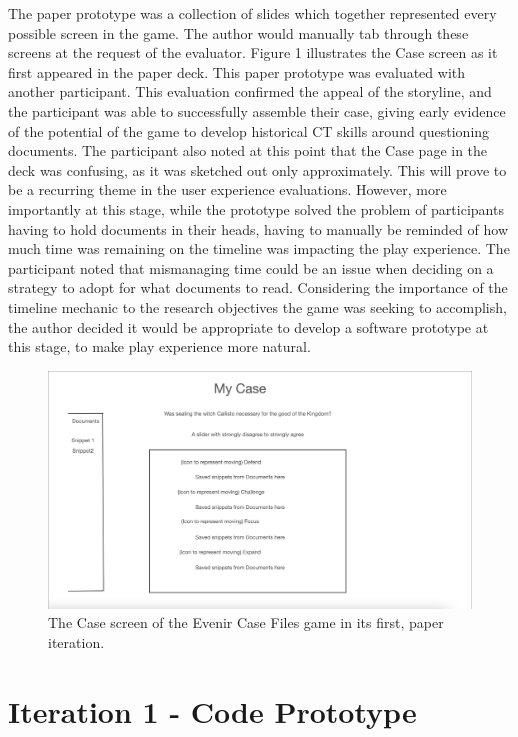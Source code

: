 \documentclass{l4proj}
\begin{document}
The paper prototype was a collection of slides which together represented every possible screen in the game. The author would manually tab through these screens at the request of the evaluator. Figure 1 illustrates the Case screen as it first appeared in the paper deck. This paper prototype was evaluated with another participant. This evaluation confirmed the appeal of the storyline, and the participant was able to successfully assemble their case, giving early evidence of the potential of the game to develop historical CT skills around questioning documents. The participant also noted at this point that the Case page in the deck was confusing, as it was sketched out only approximately. This will prove to be a recurring theme in the user experience evaluations. However, more importantly at this stage, while the prototype solved the problem of participants having to hold documents in their heads, having to manually be reminded of how much time was remaining on the timeline was impacting the play experience. The participant noted that mismanaging time could be an issue when deciding on a strategy to adopt for what documents to read. Considering the importance of the timeline mechanic to the research objectives the game was seeking to accomplish, the author decided it would be appropriate to develop a software prototype at this stage, to make play experience more natural. 

\begin{figure}[htb]
    \centering
    \includegraphics[scale=0.3]{images/MyCase_Paper.png}
    \caption{The Case screen of the Evenir Case Files game in its first, paper iteration.}
    \label{fig:Case_Paper}
\end{figure}

\section{Iteration 1 - Code Prototype}
\end{document}
